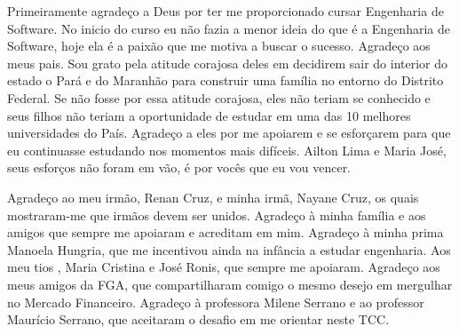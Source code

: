 \begin{agradecimentos}

Primeiramente agradeço a Deus por ter me proporcionado cursar Engenharia de Software. No inicio do curso eu não fazia a menor ideia do que é a Engenharia de Software, hoje ela é a paixão que me motiva a buscar o sucesso. Agradeço aos meus pais. Sou grato pela atitude corajosa deles em decidirem sair do interior do estado o Pará e do Maranhão para construir uma família no entorno do Distrito Federal. Se não fosse por essa atitude corajosa, eles não teriam se conhecido e seus filhos não teriam a oportunidade de estudar em uma das 10 melhores universidades do País. Agradeço a eles por me apoiarem e se esforçarem para que eu continuasse estudando nos momentos mais difíceis. Ailton Lima e Maria José, seus esforços não foram em vão, é por vocês que eu vou vencer.

Agradeço ao meu irmão, Renan Cruz, e minha irmã, Nayane Cruz, os quais mostraram-me que irmãos devem ser unidos. Agradeço à minha família e aos amigos que sempre me apoiaram e acreditam em mim. Agradeço à minha prima Manoela Hungria, que me incentivou ainda na infância a estudar engenharia. Aos meu tios , Maria Cristina e José Ronis, que sempre me apoiaram. Agradeço aos meus amigos da FGA, que compartilharam comigo o mesmo desejo em mergulhar no Mercado Financeiro. Agradeço à professora Milene Serrano e ao professor Maurício Serrano, que aceitaram o desafio em me orientar neste TCC.

\end{agradecimentos}
